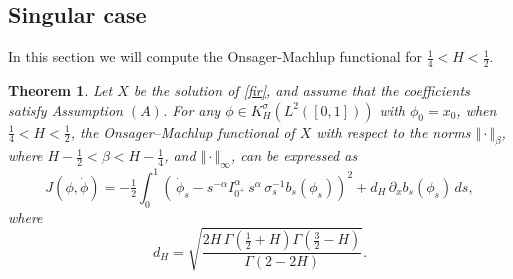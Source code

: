 \documentclass[preprint,12pt]{elsarticle}
\newtheorem{theorem}{Theorem}[section]
\theoremstyle{definition}  %
\theoremstyle{plain}  %
\begin{document}
\subsection{Singular case }
In this section we will compute the Onsager-Machlup functional for $\frac{1}{4}< H<\frac{1}{2}.$
\begin{theorem} \label{result1} Let $X$ be the solution of \eqref{fir}, and assume that the coefficients satisfy Assumption \((A)\). 
For any $\phi \in K_H^\sigma(L^2([0,1]))$ with $\phi_0 = x_0$, when $ \tfrac{1}{4} < H < \tfrac{1}{2}$, 
the Onsager--Machlup functional of $X$ with respect to the norms 
$\Vert \cdot \Vert_\beta$, where $H-\tfrac{1}{2}<\beta<H-\tfrac{1}{4}$, 
and $\Vert \cdot \Vert_\infty$, can be expressed as  
\begin{equation*}
J(\phi,\dot{\phi}) = -\tfrac{1}{2} \int_0^1 
\left(\,\dot{\phi}_s- s^{-\alpha} I_{0^+}^\alpha \, s^{\alpha} \, \sigma_s^{-1} b_s(\phi_s)\right)^2 
+ d_H \, \partial_x b_s(\phi_s)\, ds,
\end{equation*}
where
\begin{equation*}
d_H = \sqrt{\frac{2H \,\Gamma\!\left(\tfrac{1}{2}+H\right)\Gamma\!\left(\tfrac{3}{2}-H\right)}{\Gamma(2-2H)}}.
\end{equation*}

\end{theorem}
\end{document}
